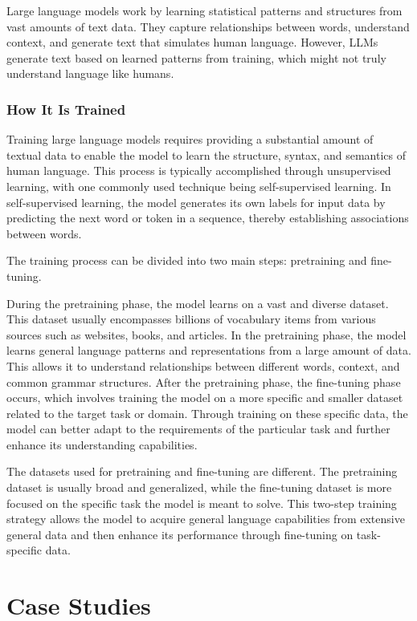 \documentclass[
]{book}
\begin{document}
Large language models work by learning statistical patterns and structures from vast amounts of text data. They capture relationships between words, understand context, and generate text that simulates human language. However, LLMs generate text based on learned patterns from training, which might not truly understand language like humans.

\hypertarget{how-it-is-trained}{%
\subsection{How It Is Trained}\label{how-it-is-trained}}

Training large language models requires providing a substantial amount of textual data to enable the model to learn the structure, syntax, and semantics of human language. This process is typically accomplished through unsupervised learning, with one commonly used technique being self-supervised learning. In self-supervised learning, the model generates its own labels for input data by predicting the next word or token in a sequence, thereby establishing associations between words.

The training process can be divided into two main steps: pretraining and fine-tuning.

During the pretraining phase, the model learns on a vast and diverse dataset. This dataset usually encompasses billions of vocabulary items from various sources such as websites, books, and articles. In the pretraining phase, the model learns general language patterns and representations from a large amount of data. This allows it to understand relationships between different words, context, and common grammar structures. After the pretraining phase, the fine-tuning phase occurs, which involves training the model on a more specific and smaller dataset related to the target task or domain. Through training on these specific data, the model can better adapt to the requirements of the particular task and further enhance its understanding capabilities.

The datasets used for pretraining and fine-tuning are different. The pretraining dataset is usually broad and generalized, while the fine-tuning dataset is more focused on the specific task the model is meant to solve. This two-step training strategy allows the model to acquire general language capabilities from extensive general data and then enhance its performance through fine-tuning on task-specific data.

\hypertarget{case-studies}{%
\chapter{Case Studies}\label{case-studies}}
\end{document}
